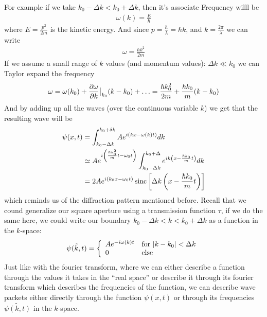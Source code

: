 For example if we take $k_0 - \Delta k < k_0 + \Delta k$, then it's associate Frequency willl be
\begin{align*}
	\omega(k) = \frac{E}{\hbar}
\end{align*}
where $E = \frac{p^2}{2m}$ is the kinetic energy. And since $p = \frac{h}{\lambda} = \hbar k$, and $k = \frac{2 \pi}{\lambda}$ we can write
\begin{align*}
	\omega = \frac{\hbar k^2}{2m}
\end{align*}
If we assume a small range of $k$ values (and momentum values): $\Delta k \ll k_0$ we can Taylor expand the frequency
\begin{align*}
	\omega = \omega(k_0) + \frac{\partial \omega}{\partial k}\big\vert_{k_0}(k - k_0) + \ldots = \frac{\hbar k_0^2}{2m} + \frac{\hbar k_0}{m}(k - k_0)
\end{align*}
And by adding up all the waves (over the continuous variable $k$) we get that the resulting wave will be
\begin{align*}
	\psi(x,t) &= \int_{k_0 - \Delta k}^{k_0 + \delta k}A e^{i(kx - \omega(k)t)}	dk\\
						&\simeq A e^{i\left(\frac{\hbar k_0^2}{m}t - \omega_0 t\right)} \int_{k_0 - \Delta k}^{k_0 + \Delta} e^{ik \left(x - \frac{\hbar k_0}{m}t\right)}dk\\
						&= 2A e^{i(k_0x - \omega_0 t)} \operatorname{sinc} \left[\Delta k\left(x - \frac{\hbar k_0}{m}t\right)\right]
\end{align*}
which reminds us of the diffraction pattern mentioned before.
Recall that we cound generalize our square aperture using a transmission function $\tau$, if we do the same here, we could write our boundary $k_0 - \Delta k < k < k_0 + \Delta k$ as a function in the $k$-space:
\begin{align*}
	\tilde{\psi(k,t)} = \left\{\begin{array}{ll}
			A e^{-i \omega(k)t} & \text{for } \vert k - k_0\vert < \Delta k \\
			0 & \text{else}
	\end{array} \right.
\end{align*}
Just like with the fourier transform, where we can either describe a function through the values it takes in the ``real space'' or describe it through its fourier transform which describes the frequencies of the function, we can describe wave packets either directly through the function $\psi(x,t)$ or through its frequencies $\tilde{\psi(k,t)}$ in the  $k$-space.

